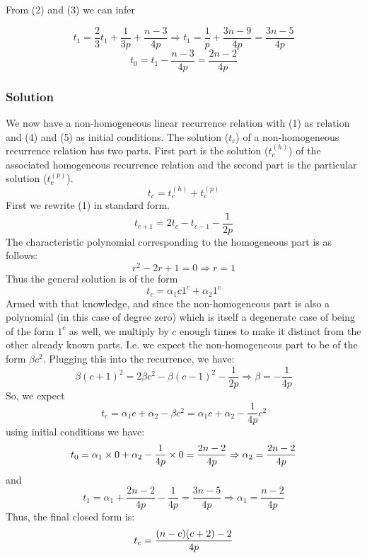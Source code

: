\documentclass[]{book}
\theoremstyle{definition}
\begin{document}
From (2) and (3) we can infer

\begin{center}
\begin{equation} \label{temp9}
    t_1 = \frac{2}{3}t_1 + \frac{1}{3p} + \frac{n-3}{4p} \Rightarrow t_1 = \frac{1}{p} + \frac{3n-9}{4p} = \frac{3n-5}{4p}
\end{equation}
\begin{equation} \label{temp10}
    t_0 = t_1 - \frac{n-3}{4p} = \frac{2n-2}{4p}
\end{equation}
\end{center}


\subsubsection*{Solution}
\qquad
We now have a non-homogeneous linear recurrence relation with (1) as relation and (4) and (5) as initial conditions. The solution ($t_c$)
of a non-homogeneous recurrence relation has two parts.
First part is the solution ($t^{(h)}_{c}$)
of the associated homogeneous recurrence relation and the second part is the particular solution ($t^{(p)}_{c}$).
$$
        t_c = t^{(h)}_{c} + t^{(p)}_{c}
$$
First we rewrite (1) in standard form.
\begin{equation}
    t_{c+1} = 2t_c - t_{c-1} - \frac{1}{2p}
\end{equation}
The characteristic polynomial corresponding to the homogeneous part is as follows:
$$
r^2 - 2r + 1 = 0 \Rightarrow r = 1
$$
Thus the general solution is of the form
$$
t_c = \alpha_{1}c 1^c + \alpha_{2} 1^c
$$
Armed with that knowledge, and since the non-homogeneous part is also a polynomial (in this case of degree zero) which is itself a degenerate case of being of the form $1^c$ as well, we multiply by $c$ enough times to make it distinct from the other already known parts. I.e. we expect the non-homogeneous part to be of the form $\beta c^2$. Plugging this into the recurrence, we have:
$$
\beta (c+1)^2 = 2\beta c^2 - \beta (c-1)^2 - \frac{1}{2p} \Rightarrow \beta = -\frac{1}{4p}
$$
So, we expect
$$
t_c = \alpha_1 c + \alpha_2 - \beta c^2 = \alpha_1 c + \alpha_2 -\frac{1}{4p}c^2
$$
using initial conditions we have:
$$
t_0 = \alpha_1 \times 0 + \alpha_2 - \frac{1}{4p}\times 0 = \frac{2n-2}{4p} \\
\Rightarrow \alpha_2 = \frac{2n-2}{4p}
$$
and
$$
t_1 = \alpha_1 + \frac{2n-2}{4p} -\frac{1}{4p} = \frac{3n-5}{4p} \Rightarrow \alpha_1 = \frac{n-2}{4p}
$$
Thus, the final closed form is:
\begin{equation} \label{closed form}
    t_c = \frac{(n-c)(c+2) - 2}{4p}\\
\end{equation}
\end{document}
